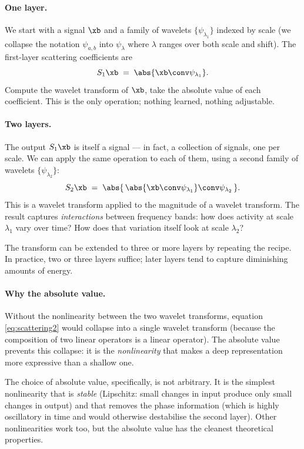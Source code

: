 \paragraph{One layer.}  We start with a signal $\xb$ and a family of
wavelets $\{\psi_{\lambda_1}\}$ indexed by scale (we collapse the
notation $\psi_{a, b}$ into $\psi_\lambda$ where $\lambda$ ranges over
both scale and shift).  The first-layer scattering coefficients are
\begin{equation}
    S_1 \xb \;=\; \abs{\xb \conv \psi_{\lambda_1}}.
    \label{eq:scattering1}
\end{equation}
Compute the wavelet transform of $\xb$, take the absolute value of each
coefficient.  This is the only operation; nothing learned, nothing
adjustable.

\paragraph{Two layers.}  The output $S_1 \xb$ is itself a signal --- in
fact, a collection of signals, one per scale.  We can apply the same
operation to each of them, using a second family of wavelets
$\{\psi_{\lambda_2}\}$:
\begin{equation}
    S_2 \xb \;=\; \abs{\, \abs{\xb \conv \psi_{\lambda_1}} \conv \psi_{\lambda_2} \,}.
    \label{eq:scattering2}
\end{equation}
This is a wavelet transform applied to the magnitude of a wavelet
transform.  The result captures \emph{interactions} between frequency
bands: how does activity at scale $\lambda_1$ vary over time?  How does
that variation itself look at scale $\lambda_2$?

The transform can be extended to three or more layers by repeating the
recipe.  In practice, two or three layers suffice; later layers tend
to capture diminishing amounts of energy.

\paragraph{Why the absolute value.}  Without the nonlinearity between
the two wavelet transforms, equation \eqref{eq:scattering2} would
collapse into a single wavelet transform (because the composition of
two linear operators is a linear operator).  The absolute value
prevents this collapse: it is the \emph{nonlinearity} that makes a deep
representation more expressive than a shallow one.

The choice of absolute value, specifically, is not arbitrary.  It is
the simplest nonlinearity that is \emph{stable} (Lipschitz: small
changes in input produce only small changes in output) and that
removes the phase information (which is highly oscillatory in time and
would otherwise destabilise the second layer).  Other nonlinearities
work too, but the absolute value has the cleanest theoretical
properties.


